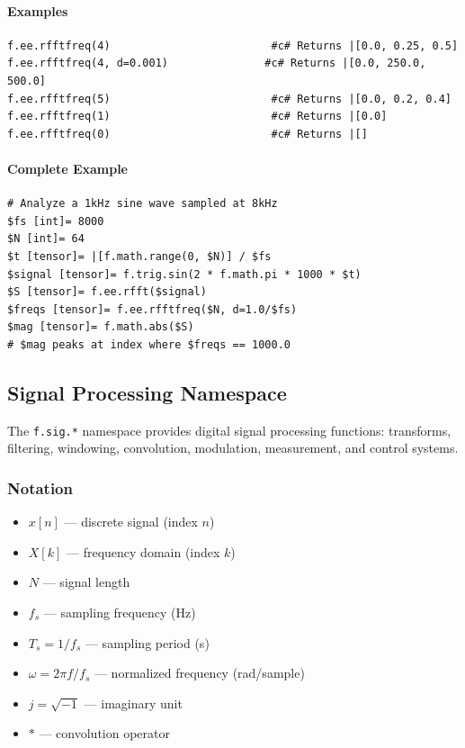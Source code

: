 \paragraph{Examples}
\begin{verbatim}
f.ee.rfftfreq(4)                         #c# Returns |[0.0, 0.25, 0.5]
f.ee.rfftfreq(4, d=0.001)               #c# Returns |[0.0, 250.0, 500.0]
f.ee.rfftfreq(5)                         #c# Returns |[0.0, 0.2, 0.4]
f.ee.rfftfreq(1)                         #c# Returns |[0.0]
f.ee.rfftfreq(0)                         #c# Returns |[]
\end{verbatim}

\paragraph{Complete Example}
\begin{verbatim}
# Analyze a 1kHz sine wave sampled at 8kHz
$fs [int]= 8000
$N [int]= 64
$t [tensor]= |[f.math.range(0, $N)] / $fs
$signal [tensor]= f.trig.sin(2 * f.math.pi * 1000 * $t)
$S [tensor]= f.ee.rfft($signal)
$freqs [tensor]= f.ee.rfftfreq($N, d=1.0/$fs)
$mag [tensor]= f.math.abs($S)
# $mag peaks at index where $freqs == 1000.0
\end{verbatim}

\subsection{Signal Processing Namespace}
\label{sec:sig-namespace}
The \texttt{f.sig.*} namespace provides digital signal processing functions: transforms, filtering, windowing, convolution, modulation, measurement, and control systems.

\subsubsection{Notation}
\begin{itemize}
\item $x[n]$ --- discrete signal (index $n$)
\item $X[k]$ --- frequency domain (index $k$)
\item $N$ --- signal length
\item $f_s$ --- sampling frequency (Hz)
\item $T_s = 1/f_s$ --- sampling period (s)
\item $\omega = 2\pi f / f_s$ --- normalized frequency (rad/sample)
\item $j = \sqrt{-1}$ --- imaginary unit
\item $*$ --- convolution operator
\end{itemize}


